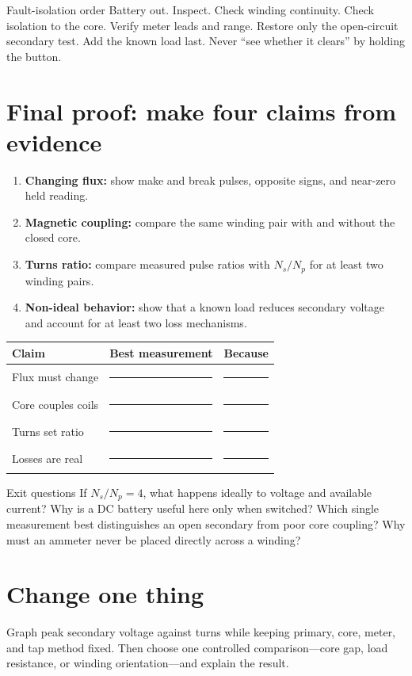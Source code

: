 \begin{gate}{Fault-isolation order}
Battery out. Inspect. Check winding continuity. Check isolation to the core.
Verify meter leads and range. Restore only the open-circuit secondary test.
Add the known load last. Never “see whether it clears” by holding the button.
\end{gate}

\section{Final proof: make four claims from evidence}
\begin{enumerate}
\item \textbf{Changing flux:} show make and break pulses, opposite signs, and
near-zero held reading.
\item \textbf{Magnetic coupling:} compare the same winding pair with and
without the closed core.
\item \textbf{Turns ratio:} compare measured pulse ratios with \(N_s/N_p\)
for at least two winding pairs.
\item \textbf{Non-ideal behavior:} show that a known load reduces secondary
voltage and account for at least two loss mechanisms.
\end{enumerate}

\begin{center}\small
\begin{tabularx}{\linewidth}{@{}p{.18\linewidth}p{.28\linewidth}L@{}}
\toprule
Claim & Best measurement & Because\\
\midrule
Flux must change & \rule{.95\linewidth}{.3pt} & \rule{.96\linewidth}{.3pt}\\[1.1em]
Core couples coils & \rule{.95\linewidth}{.3pt} & \rule{.96\linewidth}{.3pt}\\[1.1em]
Turns set ratio & \rule{.95\linewidth}{.3pt} & \rule{.96\linewidth}{.3pt}\\[1.1em]
Losses are real & \rule{.95\linewidth}{.3pt} & \rule{.96\linewidth}{.3pt}\\
\bottomrule
\end{tabularx}
\end{center}

\begin{telospanel}{Exit questions}
If \(N_s/N_p=4\), what happens ideally to voltage and available current?
Why is a DC battery useful here only when switched? Which single measurement
best distinguishes an open secondary from poor core coupling? Why must an
ammeter never be placed directly across a winding?
\end{telospanel}

\section{Change one thing}
Graph peak secondary voltage against turns while keeping primary, core,
meter, and tap method fixed. Then choose one controlled comparison—core gap,
load resistance, or winding orientation—and explain the result.

\sourcefoot

